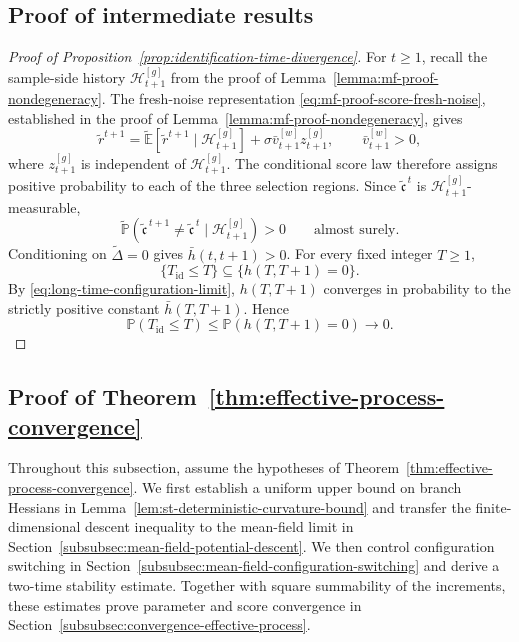 \subsection{Proof of intermediate results}


\begin{proof}[Proof of Proposition~\ref{prop:identification-time-divergence}]
For $t\geq1$, recall the sample-side history
$\mathcal H_{t+1}^{[g]}$ from the proof of
Lemma~\ref{lemma:mf-proof-nondegeneracy}.
The fresh-noise representation
\eqref{eq:mf-proof-score-fresh-noise}, established in the
proof of Lemma~\ref{lemma:mf-proof-nondegeneracy}, gives
\begin{equation}
    \tilde r^{t+1}
    =
    \tilde{\mathbb E}[ \tilde r^{t+1} \mid \mathcal{H}^{[g]}_{t+1} ]
    +\sigma\bar v_{t+1}^{[w]}z_{t+1}^{[g]},
    \qquad
    \bar v_{t+1}^{[w]}>0,
    \label{eq:long-time-score-innovation}
\end{equation}
where $z_{t+1}^{[g]}$ is independent of
$\mathcal H_{t+1}^{[g]}$.
The conditional score law therefore assigns positive probability
to each of the three selection regions.
Since $\tilde{\mathfrak c}^{\,t}$ is
$\mathcal H_{t+1}^{[g]}$-measurable,
\[
    \tilde{\mathbb P}\left(
        \tilde{\mathfrak c}^{\,t+1}
        \neq\tilde{\mathfrak c}^{\,t}
        \mid\mathcal H_{t+1}^{[g]}
    \right)>0
    \qquad\text{almost surely}.
\]
Conditioning on $\tilde\Delta=0$ gives
$\bar h(t,t+1)>0$.
For every fixed integer $T\geq1$,
\[
    \{T_{\mathrm{id}}\leq T\}
    \subseteq\{h(T,T+1)=0\}.
\]
By \eqref{eq:long-time-configuration-limit},
$h(T,T+1)$ converges in probability to the strictly positive
constant $\bar h(T,T+1)$. Hence
\[
    \mathbb P(T_{\mathrm{id}}\leq T)
    \leq\mathbb P(h(T,T+1)=0)
    \longrightarrow0.
\]
\end{proof}

\subsection{Proof of Theorem~\ref{thm:effective-process-convergence}}

Throughout this subsection, assume the hypotheses of
Theorem~\ref{thm:effective-process-convergence}.
We first establish a uniform upper bound on branch Hessians
in Lemma~\ref{lem:st-deterministic-curvature-bound}
and transfer the finite-dimensional descent inequality to the
mean-field limit in
Section~\ref{subsubsec:mean-field-potential-descent}.
We then control configuration switching in
Section~\ref{subsubsec:mean-field-configuration-switching}
and derive a two-time stability estimate.
Together with square summability of the increments, these
estimates prove parameter and score convergence in
Section~\ref{subsubsec:convergence-effective-process}.

